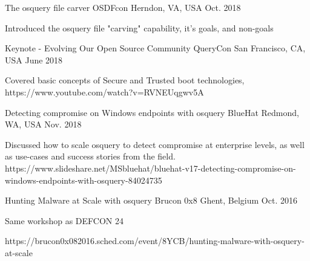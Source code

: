 


\begin{cventries}


\cventry
{The osquery file carver} %
{OSDFcon} %
{Herndon, VA, USA} %
{Oct. 2018} %
{ %
\begin{cvitems}
\item {Introduced the osquery file "carving" capability, it's goals, and non-goals}
\end{cvitems}
}


\cventry
{Keynote - Evolving Our Open Source Community} %
{QueryCon} %
{San Francisco, CA, USA} %
{June 2018} %
{ %
\begin{cvitems}
\item {Covered basic concepts of Secure and Trusted boot technologies, https://www.youtube.com/watch?v=RVNEUqgwv5A}
\end{cvitems}
}


\cventry
{Detecting compromise on Windows endpoints with osquery} %
{BlueHat} %
{Redmond, WA, USA} %
{Nov. 2018} %
{ %
\begin{cvitems}
\item {Discussed how to scale osquery to detect compromise at enterprise levels, as well as use-cases and success stories from the field. https://www.slideshare.net/MSbluehat/bluehat-v17-detecting-compromise-on-windows-endpoints-with-osquery-84024735}
\end{cvitems}
}


\cventry
{Hunting Malware at Scale with osquery} %
{Brucon 0x8} %
{Ghent, Belgium} %
{Oct. 2016} %
{ %
\begin{cvitems}
\item {Same workshop as DEFCON 24}
\item {https://brucon0x082016.sched.com/event/8YCB/hunting-malware-with-osquery-at-scale}
\end{cvitems}
}


\end{cventries}
